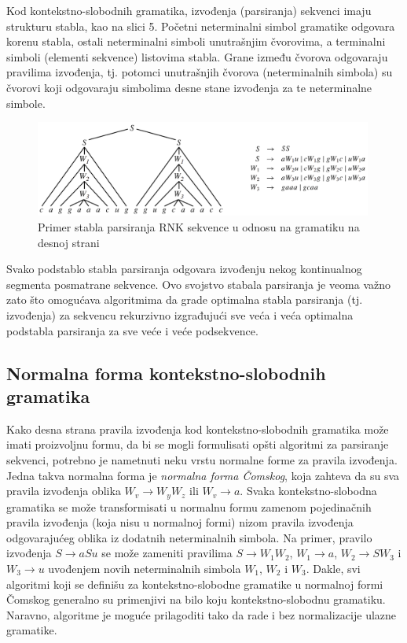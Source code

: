 \documentclass[a4paper, 12pt]{article}
\begin{document}
Kod kontekstno-slobodnih gramatika, izvođenja (parsiranja) sekvenci imaju strukturu stabla, kao na slici 5. Početni neterminalni simbol gramatike odgovara korenu stabla, ostali neterminalni simboli unutrašnjim čvorovima, a terminalni simboli (elementi sekvence) listovima stabla. Grane između čvorova odgovaraju pravilima izvođenja, tj. potomci unutrašnjih čvorova (neterminalnih simbola) su čvorovi koji odgovaraju simbolima desne stane izvođenja za te neterminalne simbole.

\begin{figure}[h!]
  \centering
  \vspace{0.05cm}
  \includegraphics[width=0.99\textwidth]{parsiranje}
  \caption{Primer stabla parsiranja RNK sekvence u odnosu na gramatiku na desnoj strani}
\end{figure}

Svako podstablo stabla parsiranja odgovara izvođenju nekog kontinualnog segmenta posmatrane sekvence. Ovo svojstvo stabala parsiranja je veoma važno zato što omogućava algoritmima da grade optimalna stabla parsiranja (tj. izvođenja) za sekvencu rekurzivno izgrađujući sve veća i veća optimalna podstabla parsiranja za sve veće i veće podsekvence.

\subsection{Normalna forma kontekstno-slobodnih gramatika}

Kako desna strana pravila izvođenja kod kontekstno-slobodnih gramatika može imati proizvoljnu formu, da bi se mogli formulisati opšti algoritmi za parsiranje sekvenci, potrebno je nametnuti neku vrstu normalne forme za pravila izvođenja. Jedna takva normalna forma je \textit{normalna forma Čomskog}, koja zahteva da su sva pravila izvođenja oblika $W_v \rightarrow W_yW_z$ ili $W_v \rightarrow a$. Svaka kontekstno-slobodna gramatika se može transformisati u normalnu formu zamenom pojedinačnih pravila izvođenja (koja nisu u normalnoj formi) nizom pravila izvođenja odgovarajućeg oblika iz dodatnih neterminalnih simbola. Na primer, pravilo izvođenja $S \rightarrow aSu$ se može zameniti pravilima $S \rightarrow W_1W_2$, $W_1 \rightarrow a$, $W_2 \rightarrow SW_3$ i $W_3 \rightarrow u$ uvođenjem novih neterminalnih simbola $W_1$, $W_2$ i $W_3$. Dakle, svi algoritmi koji se definišu za kontekstno-slobodne gramatike u normalnoj formi Čomskog generalno su primenjivi na bilo koju kontekstno-slobodnu gramatiku. Naravno, algoritme je moguće prilagoditi tako da rade i bez normalizacije ulazne gramatike.
\end{document}
